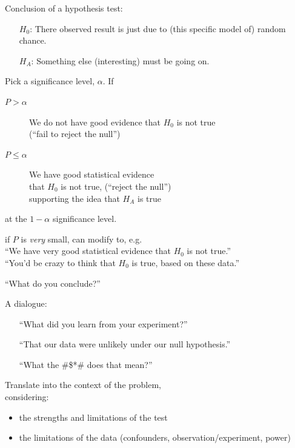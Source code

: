\begin{frame}{Conclusion of a hypothesis test:}
    \begin{itemize}
        \item[$H_0$:] There observed result is just due to (this specific model of) random chance.
        \item[$H_A$:] Something else (interesting) must be going on.
    \end{itemize}
    \pause

    Pick a \alert{significance level}, $\alpha$.  If
    \begin{description}
        \item[$P > \alpha$] We do not have good evidence that $H_0$ is not true\\
            (``fail to reject the null'')
        \item[$P \le \alpha$] We have good statistical evidence \\
            that $H_0$ is not true,
            (``reject the null'')\\
            supporting the idea that $H_A$ is true
    \end{description}
    at the $1-\alpha$ significance level.
    \pause
    \vspace{1em}

     if $P$ is \emph{very} small,
    can modify to, e.g.\\
    ``We have very good statistical evidence that $H_0$ is not true.''\\
    \pause
    ``You'd be crazy to think that $H_0$ is true, based on these data.''

\end{frame}

\begin{frame}{``What do you conclude?''}

    A dialogue:
    \begin{itemize}
        \item[] ``What did you learn from your experiment?''
            \pause
        \item[] ``That our data were unlikely under our null hypothesis.''
            \pause
        \item[] ``What the \@\#\$*\@\# does that mean?''
    \end{itemize}
    \pause
    \vspace{2em}

    \alert{Translate} into the context of the problem,\\
    considering:
    \begin{itemize}
        \item the strengths and limitations of the test
        \item the limitations of the data (confounders, observation/experiment, power)
    \end{itemize}


\end{frame}


